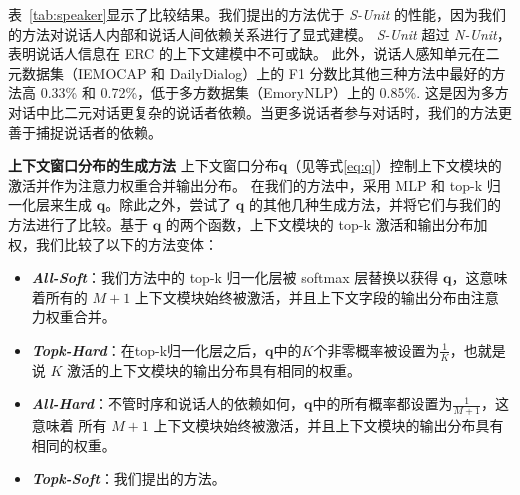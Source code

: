 表~\ref{tab:speaker}显示了比较结果。我们提出的方法优于 \textit{S-Unit} 的性能，因为我们的方法对说话人内部和说话人间依赖关系进行了显式建模。 \textit{S-Unit} 超过 \textit{N-Unit}，表明说话人信息在 ERC 的上下文建模中不可或缺。
此外，说话人感知单元在二元数据集（IEMOCAP 和 DailyDialog）上的 F1 分数比其他三种方法中最好的方法高 0.33\% 和 0.72\%，低于多方数据集（EmoryNLP）上的 0.85\%. 这是因为多方对话中比二元对话更复杂的说话者依赖。当更多说话者参与对话时，我们的方法更善于捕捉说话者的依赖。
\begin{table}[ht!]
    \centering
    \caption{在测试集上说话人感知单元消融的结果。}
    \label{tab:speaker}
\end{table}

\noindent\textbf{上下文窗口分布的生成方法 } 上下文窗口分布$\mathbf{q}$（见等式\ref{eq:q}）控制上下文模块的激活并作为注意力权重合并输出分布。 在我们的方法中，采用 MLP 和 top-k 归一化层来生成 $\mathbf{q}$。除此之外，尝试了 $\mathbf{q}$ 的其他几种生成方法，并将它们与我们的方法进行了比较。基于 $\mathbf{q}$ 的两个函数，上下文模块的 top-k 激活和输出分布加权，我们比较了以下的方法变体：
\begin{itemize}
    \item \textit{\textbf{All-Soft}}：我们方法中的 top-k 归一化层被 softmax 层替换以获得 $\mathbf{q}$，这意味着所有的 $M+1$ 上下文模块始终被激活，并且上下文字段的输出分布由注意力权重合并。
    \item \textit{\textbf{Topk-Hard}}：在top-k归一化层之后，$\mathbf{q}$中的$K$个非零概率被设置为$\frac{1}{K}$，也就是说 $K$ 激活的上下文模块的输出分布具有相同的权重。
    \item \textit{\textbf{All-Hard}}：不管时序和说话人的依赖如何，$\mathbf{q}$中的所有概率都设置为$\frac{1}{M+1}$，这意味着 所有 $M+1$ 上下文模块始终被激活，并且上下文模块的输出分布具有相同的权重。
    \item \textit{\textbf{Topk-Soft}}：我们提出的方法。
\end{itemize}

